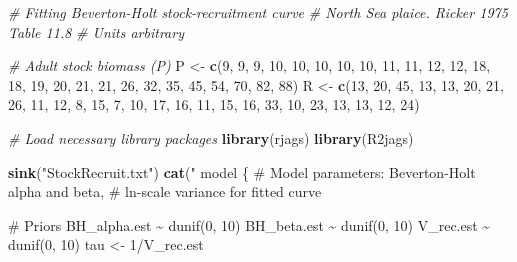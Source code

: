 \documentclass[
]{krantz}
\makeatletter
\newenvironment{Shaded}{\begin{snugshade}}{\end{snugshade}}
\newcommand{\CommentTok}[1]{\textcolor[rgb]{0.37,0.37,0.37}{\textit{#1}}}
\newcommand{\DecValTok}[1]{\textcolor[rgb]{0.06,0.06,0.06}{#1}}
\newcommand{\FunctionTok}[1]{\textcolor[rgb]{0.27,0.27,0.27}{\textbf{#1}}}
\newcommand{\NormalTok}[1]{#1}
\newcommand{\OtherTok}[1]{\textcolor[rgb]{0.37,0.37,0.37}{#1}}
\newcommand{\StringTok}[1]{\textcolor[rgb]{0.5,0.5,0.5}{#1}}
\newenvironment{kframe}{%
\medskip{}
\setlength{\fboxsep}{.8em}
 \def\at@end@of@kframe{}%
 \ifinner\ifhmode%
  \def\at@end@of@kframe{\end{minipage}}%
  \begin{minipage}{\columnwidth}%
 \fi\fi%
 \def\FrameCommand##1{\hskip\@totalleftmargin \hskip-\fboxsep
 \colorbox{shadecolor}{##1}\hskip-\fboxsep
     \hskip-\linewidth \hskip-\@totalleftmargin \hskip\columnwidth}%
 \MakeFramed {\advance\hsize-\width
   \@totalleftmargin\z@ \linewidth\hsize
   \@setminipage}}%
 {\par\unskip\endMakeFramed%
 \at@end@of@kframe}
\renewenvironment{Shaded}{\begin{kframe}}{\end{kframe}}
\makeatother
\begin{document}
\begin{Shaded}
\begin{Highlighting}[]
\CommentTok{\# Fitting Beverton{-}Holt stock{-}recruitment curve}
\CommentTok{\# North Sea plaice. Ricker 1975 Table 11.8}
\CommentTok{\# Units arbitrary}

\CommentTok{\# Adult stock biomass (P)}
\NormalTok{P }\OtherTok{\textless{}{-}} \FunctionTok{c}\NormalTok{(}\DecValTok{9}\NormalTok{, }\DecValTok{9}\NormalTok{, }\DecValTok{9}\NormalTok{, }\DecValTok{10}\NormalTok{, }\DecValTok{10}\NormalTok{, }\DecValTok{10}\NormalTok{, }\DecValTok{10}\NormalTok{, }\DecValTok{10}\NormalTok{, }\DecValTok{11}\NormalTok{, }\DecValTok{11}\NormalTok{, }\DecValTok{12}\NormalTok{, }\DecValTok{12}\NormalTok{, }\DecValTok{18}\NormalTok{, }\DecValTok{18}\NormalTok{, }\DecValTok{19}\NormalTok{, }\DecValTok{20}\NormalTok{,}
       \DecValTok{21}\NormalTok{, }\DecValTok{21}\NormalTok{, }\DecValTok{26}\NormalTok{, }\DecValTok{32}\NormalTok{, }\DecValTok{35}\NormalTok{, }\DecValTok{45}\NormalTok{, }\DecValTok{54}\NormalTok{, }\DecValTok{70}\NormalTok{, }\DecValTok{82}\NormalTok{, }\DecValTok{88}\NormalTok{)}
\NormalTok{R }\OtherTok{\textless{}{-}} \FunctionTok{c}\NormalTok{(}\DecValTok{13}\NormalTok{, }\DecValTok{20}\NormalTok{, }\DecValTok{45}\NormalTok{, }\DecValTok{13}\NormalTok{, }\DecValTok{13}\NormalTok{, }\DecValTok{20}\NormalTok{, }\DecValTok{21}\NormalTok{, }\DecValTok{26}\NormalTok{, }\DecValTok{11}\NormalTok{, }\DecValTok{12}\NormalTok{, }\DecValTok{8}\NormalTok{, }\DecValTok{15}\NormalTok{, }\DecValTok{7}\NormalTok{, }\DecValTok{10}\NormalTok{, }\DecValTok{17}\NormalTok{,}
       \DecValTok{16}\NormalTok{, }\DecValTok{11}\NormalTok{, }\DecValTok{15}\NormalTok{, }\DecValTok{16}\NormalTok{, }\DecValTok{33}\NormalTok{, }\DecValTok{10}\NormalTok{, }\DecValTok{23}\NormalTok{, }\DecValTok{13}\NormalTok{, }\DecValTok{13}\NormalTok{, }\DecValTok{12}\NormalTok{, }\DecValTok{24}\NormalTok{)}

\CommentTok{\# Load necessary library packages}
\FunctionTok{library}\NormalTok{(rjags)}
\FunctionTok{library}\NormalTok{(R2jags)}

\FunctionTok{sink}\NormalTok{(}\StringTok{"StockRecruit.txt"}\NormalTok{)}
\FunctionTok{cat}\NormalTok{(}\StringTok{"}
\StringTok{model \{}
\StringTok{\# Model parameters: Beverton{-}Holt alpha and beta, }
\StringTok{\# ln{-}scale variance for fitted curve}

\StringTok{\# Priors}
\StringTok{ BH\_alpha.est \textasciitilde{} dunif(0, 10)}
\StringTok{ BH\_beta.est \textasciitilde{} dunif(0, 10)}
\StringTok{ V\_rec.est \textasciitilde{} dunif(0, 10)}
\StringTok{ tau \textless{}{-} 1/V\_rec.est}


\end{Highlighting}
\end{Shaded}
\end{document}
